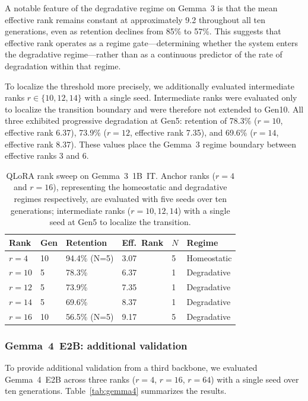 \documentclass[a4paper,fleqn]{cas-dc}
\newif\ifshowchanges
\newcommand{\rev}[1]{\ifshowchanges{\color{blue}#1}\else{#1}\fi}
\begin{document}
A notable feature of the degradative regime on Gemma~3 is that the mean
effective rank remains constant at approximately 9.2 throughout all ten
generations, even as retention declines from 85\% to 57\%. This suggests that
effective rank operates as a regime gate---determining whether the system
enters the degradative regime---rather than as a continuous predictor of the
rate of degradation within that regime.

To localize the threshold more precisely, we additionally evaluated intermediate
ranks $r \in \{10, 12, 14\}$ with a single seed. Intermediate ranks were
evaluated only to localize the transition boundary and were therefore not
extended to Gen10. All three exhibited progressive
degradation at Gen5: retention of 78.3\% ($r=10$, effective rank 6.37), 73.9\%
($r=12$, effective rank 7.35), and 69.6\% ($r=14$, effective rank 8.37). These
values place the Gemma~3 regime boundary between effective ranks 3 and 6.

\begin{table}[width=.95\linewidth,cols=6,pos=htbp]
\caption{QLoRA rank sweep on Gemma~3~1B~IT. Anchor ranks ($r=4$ and $r=16$),
representing the homeostatic and degradative regimes respectively,
are evaluated with five seeds over ten generations; intermediate ranks
($r=10,12,14$) with a single seed at Gen5 to localize the transition.}\label{tab:gemma3}
\begin{tabular*}{\tblwidth}{@{} llllll@{} }
\toprule
Rank & Gen & Retention & Eff.\ Rank & \rev{$N$} & Regime \\
\midrule
$r=4$   & 10 & 94.4\% (N=5) & 3.07  & \rev{5} & Homeostatic \\
$r=10$  & 5  & 78.3\%       & 6.37  & \rev{1} & Degradative \\
$r=12$  & 5  & 73.9\%       & 7.35  & \rev{1} & Degradative \\
$r=14$  & 5  & 69.6\%       & 8.37  & \rev{1} & Degradative \\
$r=16$  & 10 & 56.5\% (N=5) & 9.17  & \rev{5} & Degradative \\
\bottomrule
\end{tabular*}
\end{table}

\subsubsection{Gemma~4~E2B: additional validation}

To provide additional validation from a third backbone, we evaluated
Gemma~4~E2B across three ranks ($r=4$, $r=16$, $r=64$) with a single seed
over ten generations. Table~\ref{tab:gemma4} summarizes the results.
\end{document}

